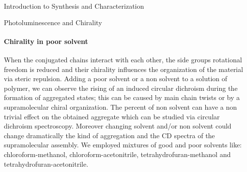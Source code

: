\begin{section}{Introduction to Synthesis and Characterization}
\begin{subsection}{Photoluminescence and Chirality}
\paragraph{Chirality in poor solvent} When the conjugated chains interact with each other, the side groups rotational freedom is reduced and their chirality influences the organization of the material via steric repulsion. Adding a poor solvent or a non solvent to a solution of polymer, we can observe the rising of an induced circular dichroism during the formation of aggregated states; this can be caused by main chain twists or by a supramolecular chiral organization. 
The percent of non solvent can have a non trivial effect on the obtained aggregate which can be studied via circular dichroism spectroscopy. Moreover changing solvent and/or non solvent could change dramatically the kind of aggregation and the \gls{CD} spectra of the supramolecular assembly. We employed mixtures of good and poor solvents like: chloroform-methanol, chloroform-acetonitrile, tetrahydrofuran-methanol and tetrahydrofuran-acetonitrile.

\end{subsection}
\end{section}